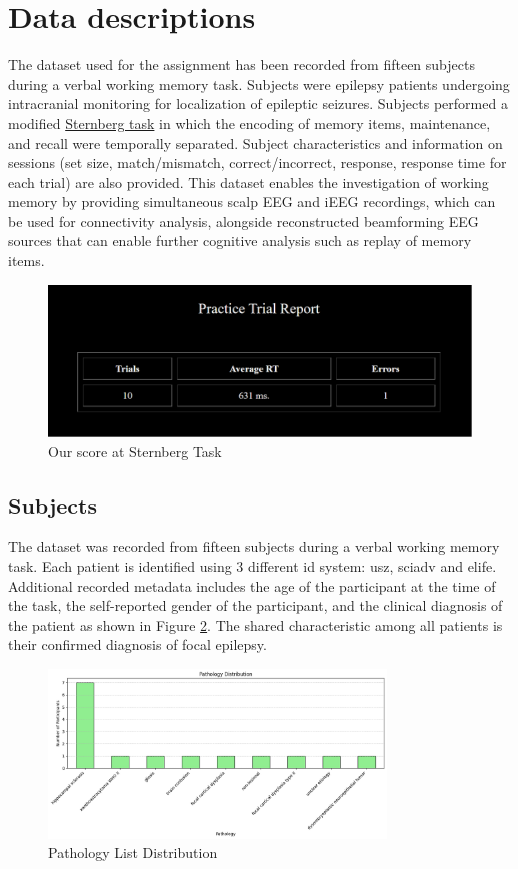 \documentclass{article}
\begin{document}
\section{Data descriptions}

The dataset \cite{ds004752:1.0.0} used for the assignment has been recorded from fifteen subjects during a verbal working memory task. Subjects were epilepsy patients undergoing intracranial monitoring for localization of epileptic seizures. Subjects performed a modified \href{https://rpadgett.butler.edu/nw221/sternberg_lab/index.html}{Sternberg task} in which the encoding of memory items, maintenance, and recall were temporally separated. Subject characteristics and information on sessions (set size, match/mismatch, correct/incorrect, response, response time for each trial) are also provided. This dataset enables the investigation of working memory by providing simultaneous scalp EEG and iEEG recordings, which can be used for connectivity analysis, alongside reconstructed beamforming EEG sources that can enable further cognitive analysis such as replay of memory items.

\begin{figure}
    \centering
    \includegraphics[width=0.5\linewidth]{img/test pappol.png}
    \caption{Our score at Sternberg Task}
    \label{fig:task}
\end{figure}

\newpage

\subsection{Subjects}

The dataset was recorded from fifteen subjects during a verbal working memory task. Each patient is identified using 3 different id system: usz, sciadv and elife. Additional recorded metadata includes the age of the participant at the time of the task, the self-reported gender of the participant, and the clinical diagnosis of the patient as shown in Figure \ref{fig:path_dist}. The shared characteristic among all patients is their confirmed diagnosis of focal epilepsy.
    
\begin{figure}[h]
  \centering
  \includegraphics[width=0.8\textwidth]{img/pathology_dist.png}
  \caption{Pathology List Distribution}
  \label{fig:path_dist}
\end{figure}
\end{document}
